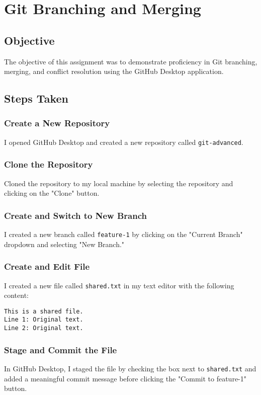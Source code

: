 

\section{Git Branching and Merging}

\subsection{Objective}
The objective of this assignment was to demonstrate proficiency in Git branching, merging, and conflict resolution using the GitHub Desktop application.

\subsection{Steps Taken}

\subsubsection{Create a New Repository}
I opened GitHub Desktop and created a new repository called \texttt{git-advanced}.

\subsubsection{Clone the Repository}
Cloned the repository to my local machine by selecting the repository and clicking on the "Clone" button.

\subsubsection{Create and Switch to New Branch}
I created a new branch called \texttt{feature-1} by clicking on the "Current Branch" dropdown and selecting "New Branch."

\subsubsection{Create and Edit File}
I created a new file called \texttt{shared.txt} in my text editor with the following content:
\begin{verbatim}
This is a shared file.
Line 1: Original text.
Line 2: Original text.
\end{verbatim}

\subsubsection{Stage and Commit the File}
In GitHub Desktop, I staged the file by checking the box next to \texttt{shared.txt} and added a meaningful commit message before clicking the "Commit to feature-1" button.

